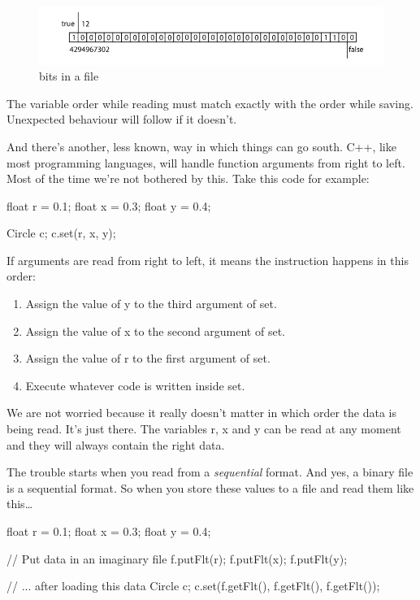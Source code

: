 \begin{figure}[ht]
\centering
\includegraphics[width=0.8\linewidth]{../images/filebits}
\caption[]{bits in a file}
\label{fig:filebits}
\end{figure}

\begin{note}
The variable order while reading must match exactly with the order while saving. Unexpected behaviour will follow if it doesn't.
\end{note}

And there's another, less known, way in which things can go south. C++, like most programming languages, will handle function arguments from right to left. Most of the time we're not bothered by this. Take this code for example:
\begin{code}
float r = 0.1;
float x = 0.3;
float y = 0.4;

Circle c;
c.set(r, x, y);
\end{code}

If arguments are read from right to left, it means the instruction  happens in this order:

\begin{enumerate}
	\item Assign the value of y to the third argument of set.
	\item Assign the value of x to the second argument of set.
	\item Assign the value of r to the first argument of set.
	\item Execute whatever code is written inside set.
\end{enumerate}

We are not worried because it really doesn't matter in which order the data is being read. It's just there. The variables r, x and y can be read at any moment and they will always contain the right data.

The trouble starts when you read from a \textit{sequential} format. And yes, a binary file is a sequential format. So when you store these values to a file and read them like this\ldots

\begin{code}
float r = 0.1;
float x = 0.3;
float y = 0.4;

// Put data in an imaginary file
f.putFlt(r);
f.putFlt(x);
f.putFlt(y);

// ... after loading this data
Circle c;
c.set(f.getFlt(), f.getFlt(), f.getFlt());
\end{code}

